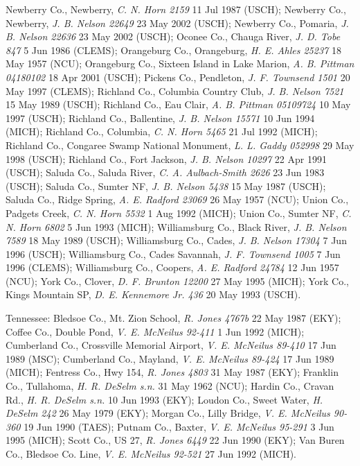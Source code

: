 \documentclass{article}
\begin{document}
Newberry Co., Newberry, \textit{C. N. Horn 2159} 11 Jul 1987 (USCH);
Newberry Co., Newberry, \textit{J. B. Nelson 22649} 23 May 2002 (USCH);
Newberry Co., Pomaria, \textit{J. B. Nelson 22636} 23 May 2002 (USCH);
Oconee Co., Chauga River, \textit{J. D. Tobe 847} 5 Jun 1986 (CLEMS);
Orangeburg Co., Orangeburg, \textit{H. E. Ahles 25237} 18 May 1957 (NCU);
Orangeburg Co., Sixteen Island in Lake Marion, \textit{A. B. Pittman 04180102} 18 Apr 2001 (USCH);
Pickens Co., Pendleton, \textit{J. F. Townsend 1501} 20 May 1997 (CLEMS);
Richland Co., Columbia Country Club, \textit{J. B. Nelson 7521} 15 May 1989 (USCH);
Richland Co., Eau Clair, \textit{A. B. Pittman 05109724} 10 May 1997 (USCH);
Richland Co., Ballentine, \textit{J. B. Nelson 15571} 10 Jun 1994 (MICH);
Richland Co., Columbia, \textit{C. N. Horn 5465} 21 Jul 1992 (MICH);
Richland Co., Congaree Swamp National Monument, \textit{L. L. Gaddy 052998} 29 May 1998 (USCH);
Richland Co., Fort Jackson, \textit{J. B. Nelson 10297} 22 Apr 1991 (USCH);
Saluda Co., Saluda River, \textit{C. A. Aulbach-Smith 2626} 23 Jun 1983 (USCH);
Saluda Co., Sumter NF, \textit{J. B. Nelson 5438} 15 May 1987 (USCH);
Saluda Co., Ridge Spring, \textit{A. E. Radford 23069} 26 May 1957 (NCU);
Union Co., Padgets Creek, \textit{C. N. Horn 5532} 1 Aug 1992 (MICH);
Union Co., Sumter NF, \textit{C. N. Horn 6802} 5 Jun 1993 (MICH);
Williamsburg Co., Black River, \textit{J. B. Nelson 7589} 18 May 1989 (USCH);
Williamsburg Co., Cades, \textit{J. B. Nelson 17304} 7 Jun 1996 (USCH);
Williamsburg Co., Cades Savannah, \textit{J. F. Townsend 1005} 7 Jun 1996 (CLEMS);
Williamsburg Co., Coopers, \textit{A. E. Radford 24784} 12 Jun 1957 (NCU);
York Co., Clover, \textit{D. F. Brunton 12200} 27 May 1995 (MICH);
York Co., Kings Mountain SP, \textit{D. E. Kennemore Jr. 436} 20 May 1993 (USCH).

Tennessee:
Bledsoe Co., Mt. Zion School, \textit{R. Jones 4767b} 22 May 1987 (EKY);
Coffee Co., Double Pond, \textit{V. E. McNeilus 92-411} 1 Jun 1992 (MICH);
Cumberland Co., Crossville Memorial Airport, \textit{V. E. McNeilus 89-410} 17 Jun 1989 (MSC);
Cumberland Co., Mayland, \textit{V. E. McNeilus 89-424} 17 Jun 1989 (MICH);
Fentress Co., Hwy 154, \textit{R. Jones 4803} 31 May 1987 (EKY);
Franklin Co., Tullahoma, \textit{H. R. DeSelm s.n.} 31 May 1962 (NCU);
Hardin Co., Cravan Rd., \textit{H. R. DeSelm s.n.} 10 Jun 1993 (EKY);
Loudon Co., Sweet Water, \textit{H. DeSelm 242} 26 May 1979 (EKY);
Morgan Co., Lilly Bridge, \textit{V. E. McNeilus 90-360} 19 Jun 1990 (TAES);
Putnam Co., Baxter, \textit{V. E. McNeilus 95-291} 3 Jun 1995 (MICH);
Scott Co., US 27, \textit{R. Jones 6449} 22 Jun 1990 (EKY);
Van Buren Co., Bledsoe Co. Line, \textit{V. E. McNeilus 92-521} 27 Jun 1992 (MICH).
\end{document}
